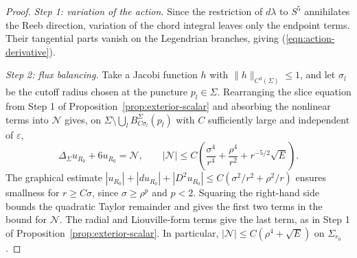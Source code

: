 \documentclass[11pt,a4paper]{article}
\numberwithin{equation}{section}
\theoremstyle{definition}
\theoremstyle{remark}
\begin{document}
	\begin{proof}
		\emph{Step 1: variation of the action.}
		Since the restriction of $d\lambda$ to $S^5$ annihilates the Reeb
		direction, variation of the chord integral leaves only the endpoint terms. Their tangential parts vanish
		on the Legendrian branches, giving (\ref{eqn:action-derivative}).
		
		\smallskip
		\noindent\emph{Step 2: flux balancing.}
		Take a Jacobi function $h$ with $\|h\|_{C^3(\Sigma)}\le1$, and let
		$\sigma_l$ be the cutoff radius chosen at the puncture $p_l\in\Sigma$.
		Rearranging the slice equation from Step 1 of
		Proposition~\ref{prop:exterior-scalar} and absorbing the nonlinear terms
		into $\mathcal N$ gives, on
		$\Sigma\setminus\bigcup_l B_{C\sigma_l}^{\Sigma}(p_l)$
		with $C$ sufficiently large and independent of $\varepsilon$,
		\[
		\Delta_\Sigma u_{R_0}+6u_{R_0}=\mathcal N,\qquad
		|\mathcal N|\le C\left(\frac{\sigma^4}{r^4}
		+\frac{\rho^4}{r^2}+r^{-5/2}\sqrt E\right).
		\]
		The graphical estimate
		$|u_{R_0}|+|du_{R_0}|+|D^2u_{R_0}|\le C(\sigma^2/r^2+\rho^2/r)$
		ensures smallness for $r\ge C\sigma$, since $\sigma\ge\rho^p$ and $p<2$.
		Squaring the right-hand side bounds the quadratic Taylor remainder and gives the first
		two terms in the bound for $\mathcal N$.
		The radial and Liouville-form terms give the last term,
		as in Step 1 of Proposition~\ref{prop:exterior-scalar}.
		In particular, $|\mathcal N|\le C(\rho^4+\sqrt E)$ on $\Sigma_{r_0}$.
		

\end{proof}
\end{document}
